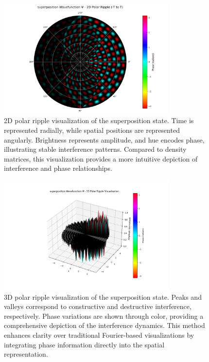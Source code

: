 \documentclass[12pt]{article}
\begin{document}
\begin{figure}[H]
\centering
\includegraphics[width=0.8\textwidth]{images/superposition_wavefunction_2d_polar_probability_density_with_phase.png}
\caption{2D polar ripple visualization of the superposition state. Time is represented radially, while spatial positions are represented angularly. Brightness represents amplitude, and hue encodes phase, illustrating stable interference patterns. Compared to density matrices, this visualization provides a more intuitive depiction of interference and phase relationships.}
\label{fig:superposition_2d_polar}
\end{figure}

\begin{figure}[H]
\centering
\includegraphics[width=0.8\textwidth]{images/superposition_wavefunction_3d_polar_probability_density_with_phase.png}
\caption{3D polar ripple visualization of the superposition state. Peaks and valleys correspond to constructive and destructive interference, respectively. Phase variations are shown through color, providing a comprehensive depiction of the interference dynamics. This method enhances clarity over traditional Fourier-based visualizations by integrating phase information directly into the spatial representation.}
\label{fig:superposition_3d_polar}
\end{figure}
\end{document}
